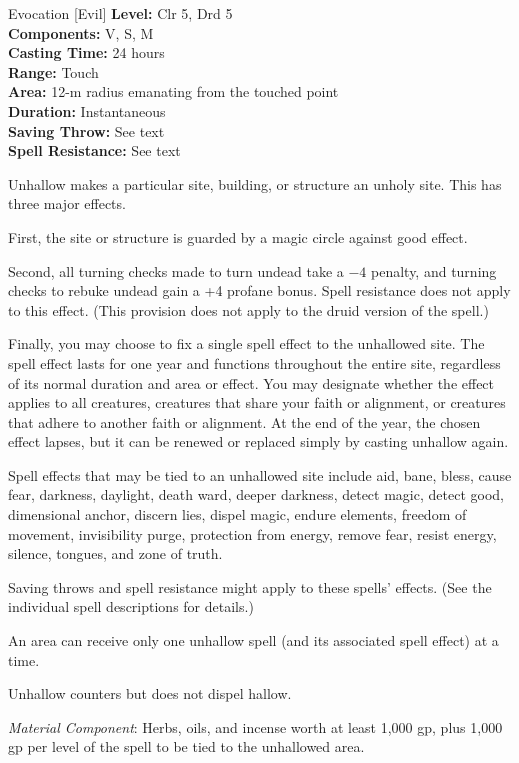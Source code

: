 {Evocation [Evil]}
{
	\textbf{Level:}
	Clr 5, Drd 5\\
	\textbf{Components:}
	V, S, M\\
	\textbf{Casting Time:}
	24 hours\\
	\textbf{Range:}
	Touch\\
	\textbf{Area:}
	12-m radius emanating from the touched point\\
	\textbf{Duration:}
	Instantaneous\\
	\textbf{Saving Throw:}
	See text\\
	\textbf{Spell Resistance:}
	See text\\
}
{
	Unhallow makes a particular site, building, or structure an unholy site. This has three major effects.

	First, the site or structure is guarded by a magic circle against good effect.

	Second, all turning checks made to turn undead take a $-4$ penalty, and turning checks to rebuke undead gain a +4 profane bonus. Spell resistance does not apply to this effect. (This provision does not apply to the druid version of the spell.)

	Finally, you may choose to fix a single spell effect to the unhallowed site. The spell effect lasts for one year and functions throughout the entire site, regardless of its normal duration and area or effect. You may designate whether the effect applies to all creatures, creatures that share your faith or alignment, or creatures that adhere to another faith or alignment. At the end of the year, the chosen effect lapses, but it can be renewed or replaced simply by casting unhallow again.

	Spell effects that may be tied to an unhallowed site include aid, bane, bless, cause fear, darkness, daylight, death ward, deeper darkness, detect magic, detect good, dimensional anchor, discern lies, dispel magic, endure elements, freedom of movement, invisibility purge, protection from energy, remove fear, resist energy, silence, tongues, and zone of truth.

Saving throws and spell resistance might apply to these spells' effects. (See the individual spell descriptions for details.)

	An area can receive only one unhallow spell (and its associated spell effect) at a time.

	Unhallow counters but does not dispel hallow.

	\textit{Material Component}:
	Herbs, oils, and incense worth at least 1,000 gp, plus 1,000 gp per level of the spell to be tied to the unhallowed area.

}
